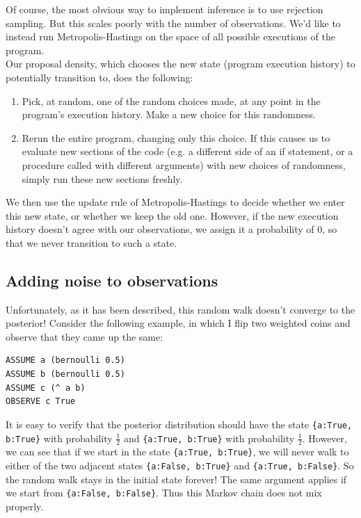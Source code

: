 \documentclass[10pt]{article}
\begin{document}
Of course, the most obvious way to implement inference is to use rejection sampling.   But this scales poorly with the number of observations.  We'd like to instead run Metropolis-Hastings on the space of all possible executions of the program.  \\

Our proposal density, which chooses the new state (program execution history) to potentially transition to, does the following:   
\begin{enumerate}
\item Pick, at random, one of the random choices made, at any point in the program's execution history.  Make a new choice for this randomness.  
\item Rerun the entire program, changing only this choice.  If this causes us to evaluate new sections of the code (e.g. a different side of an if statement, or a procedure called with different arguments) with new choices of randomness, simply run these new sections freshly.  
\end{enumerate}

We then use the update rule of Metropolis-Hastings to decide whether we enter this new state, or whether we keep the old one.  However, if the new execution history doesn't agree with our observations, we assign it a probability of 0, so that we never transition to such a state.   

\subsection{Adding noise to observations}

Unfortunately, as it has been described, this random walk doesn't converge to the posterior!  Consider the following example, in which I flip two weighted coins and observe that they came up the same:  

\begin{leftbar} \begin{small} \begin{verbatim}
ASSUME a (bernoulli 0.5)
ASSUME b (bernoulli 0.5)
ASSUME c (^ a b)
OBSERVE c True 
\end{verbatim} \end{small} \end{leftbar}

It is easy to verify that the posterior distribution should have the state {\tt \{a:True, b:True\}} with probability $\frac{1}{2}$ and {\tt \{a:True, b:True\}} with probability $\frac{1}{2}$.  However, we can see that if we start in the state {\tt \{a:True, b:True\}}, we will never walk to either of the two adjacent states {\tt \{a:False, b:True\}} and {\tt \{a:True, b:False\}}.  So the random walk stays in the initial state forever!  The same argument applies if we start from {\tt \{a:False, b:False\}}.  Thus this Markov chain does not mix properly.  \vspace{6 pt}
\end{document}
